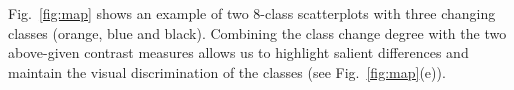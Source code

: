 Fig.~\ref{fig:map} shows an example of two 8-class scatterplots with three  changing classes (orange, blue and black). Combining the class change degree with the two above-given contrast measures allows us to highlight salient differences and maintain the visual discrimination of the classes (see Fig.~\ref{fig:map}(e)).
